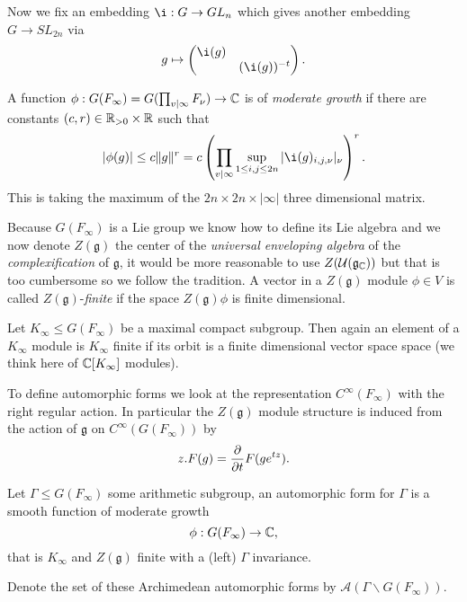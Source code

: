 Now we fix an embedding \(\i : G\to GL_n\) which gives another embedding \(G\to SL_{2n}\) via
	\[g\mapsto \begin{pmatrix}
		\i (g) & \\
		 & (\i (g))^{-t}
	\end{pmatrix}.\]

	A function \(\phi : G(F_\infty) = G(\prod_{v|\infty} F_\nu) \to \C \) is of \textit{moderate growth} if there are constants \((c,r)\in \R_{>0}\times \R\) such that 
	\[|\phi(g)| \leq c\norm{g}^r = c \left(\prod_{v|\infty} \sup_{1\leq i, j\leq 2n} |\i (g)_{i,j, \nu}|_\nu\right)^r.\]
	This is taking the maximum of the \(2n\times 2n \times |\infty| \) three dimensional matrix. 

    Because \(G(F_\infty)\) is a Lie group we know how to define its Lie algebra and we now denote \(Z(\mathfrak{g})\) the center of the \textit{universal enveloping algebra} of the \textit{complexification} of \(\mathfrak{g}\), it would be more reasonable to use \(Z(\mathcal{U}(\mathfrak{g}_{\C}))\) but that is too cumbersome so we follow the tradition. 
    A vector in a \(Z(\mathfrak{g})\) module \(\phi\in V\) is called \(Z(\mathfrak{g})\)-\textit{finite} if the space \(Z(\mathfrak{g})\phi\) is finite dimensional. 

	Let \(K_\infty\leq G(F_\infty)\) be a maximal compact subgroup. Then again an element of a \(K_\infty\) module is \(K_\infty\) finite if its orbit is a finite dimensional vector space space (we think here of \(\C[K_\infty]\) modules).

	To define automorphic forms we look at the representation \(C^\infty(F_\infty)\) with the right regular action.  In particular the \(Z(\mathfrak{g})\) module structure is induced from the action of \(\mathfrak{g}\) on \(C^\infty(G(F_\infty))\) by \label{lie_algebra_action}
	\[z.F(g) = \frac{\partial }{\partial t}F(ge^{tz}).\] 

	\begin{Definition}
		Let \(\Gamma\leq G(F_\infty)\) some arithmetic subgroup, an automorphic form for \(\Gamma\) is a smooth function of moderate growth 
		\[\phi: G(F_\infty) \to \C,\]
		that is \(K_\infty\) and \(Z(\mathfrak{g})\) finite with a (left) \(\Gamma\) invariance. 

		Denote the set of these Archimedean automorphic forms by \(\mathcal{A}(\Gamma \backslash G(F_\infty))\).

	\end{Definition}


